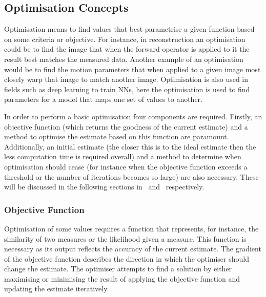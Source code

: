         \subsection{Optimisation Concepts} \label{sec:optimisation_concepts}
            Optimisation means to find values that best parametrise a given function based on some criteria or objective. %
            For instance, in reconstruction an optimisation could be to find the image that when the forward operator is applied to it the result best matches the measured data. Another example of an optimisation would be to find the motion parameters that when applied to a given image most closely warp that image to match another image. Optimisation is also used in fields such as deep learning to train \glspl{NN}, here the optimisation is used to find parameters for a model that maps one set of values to another.%
            
            
            In order to perform a basic optimisation four components are required. Firstly, an objective function (which returns the goodness of the current estimate) and a method to optimise the estimate based on this function are paramount. Additionally, an initial estimate (the closer this is to the ideal estimate then the less computation time is required overall) and a method to determine when optimisation should cease (for instance when the objective function exceeds a threshold or the number of iterations becomes so large) are also necessary. These will be discussed in the following sections in~ and~ respectively.
        
            \subsubsection{Objective Function} \label{sec:objective_function}
                Optimisation of some values requires a function that represents, for instance, the similarity of two measures or the likelihood given a measure. This function is necessary as its output reflects the accuracy of the current estimate. The gradient of the objective function describes the direction in which the optimiser should change the estimate. The optimiser attempts to find a solution by either maximising or minimising the result of applying the objective function and updating the estimate iteratively.
                
